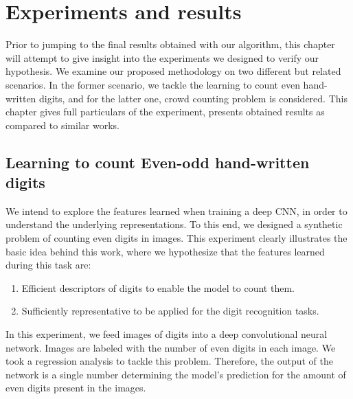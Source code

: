 \newpage
\chapter{Experiments and results}
\label{sec:experiments}

Prior to jumping to the final results obtained with our algorithm, this chapter will attempt to give insight into the experiments we designed to verify our hypothesis. We examine our proposed methodology on two different but related scenarios. In the former scenario, we tackle the learning to count even hand-written digits, and for the latter one, crowd counting problem is considered. This chapter gives full particulars of the experiment, presents obtained results as compared to similar works.

\section{Learning to count Even-odd hand-written digits}

We intend to explore the features learned when training a deep CNN, in order to understand the underlying representations. To this end, we designed a synthetic problem of counting even digits in images. This experiment clearly illustrates the basic idea behind this work, where we hypothesize that the features learned during this task are:
\begin{enumerate}
\item Efficient descriptors of digits to enable the model to count them.
\item Sufficiently representative to be applied for the digit recognition tasks. 
\end{enumerate}

In this experiment, we feed images of digits into a deep convolutional neural network. Images are labeled with the number of even digits in each image. We took a regression analysis to tackle this problem. Therefore, the output of the network is a single number determining the model's prediction for the amount of even digits present in the images. 
 

